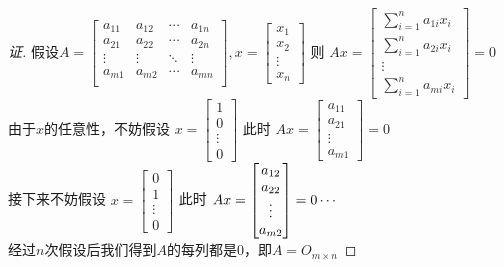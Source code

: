 \documentclass[10pt,a4paper]{report}
\begin{document}
\begin{proof}[证]
	假设$A = 
	\left[
	\begin{matrix}
	a_{11} & a_{12} & \cdots & a_{1n} \\
	a_{21} & a_{22} & \cdots & a_{2n} \\
	\vdots & \vdots & \ddots & \vdots \\
	a_{m1} & a_{m2} & \cdots & a_{mn} \\
	\end{matrix}
	\right],
	x = 
	\left[
	\begin{matrix}
	x_{1} \\
	x_{2} \\
	\vdots\\
	x_{n} 
	\end{matrix}
	\right]
	$
	则
	$
	Ax = \left[
	\begin{matrix}
	\sum\limits_{i = 1}^{n}a_{1i}x_{i} \\
	\sum\limits_{i = 1}^{n}a_{2i}x_{i} \\
	\vdots\\
	\sum\limits_{i = 1}^{n}a_{mi}x_{i} 
	\end{matrix}
	\right] = 0
	$\\
	由于$x$的任意性，不妨假设
	$
	x = 
	\left[
	\begin{matrix}
	1 \\
	0 \\
	\vdots\\
	0 
	\end{matrix}
	\right]
	$
	此时
	$
	Ax = \left[
	\begin{matrix}
	a_{11}\\
	a_{21}\\
	\vdots\\
	a_{m1}
	\end{matrix}
	\right] = 0
	$\\
	接下来不妨假设
	$
	x = 
	\left[
	\begin{matrix}
	0 \\
	1 \\
	\vdots\\
	0 
	\end{matrix}
	\right]
	$
	此时
	$
	Ax = \left[
	\begin{matrix}
	a_{12}\\
	a_{22}\\
	\vdots\\
	a_{m2}
	\end{matrix}
	\right] = 0\\
	\cdots
	$\\
	经过$n$次假设后我们得到$A$的每列都是0，即$A=O_{m \times n}$
\end{proof}
\end{document}

